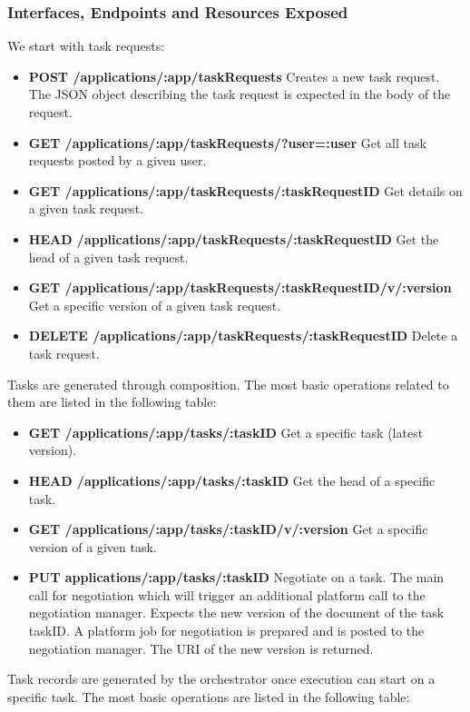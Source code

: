 \subsubsection{Interfaces, Endpoints and Resources Exposed}
We start with task requests:
\begin{itemize}
\item {\bf POST /applications/:app/taskRequests} Creates a new task request. The JSON object describing the task request is expected in the body of the request. %
\item {\bf GET /applications/:app/taskRequests/?user=:user} Get all task requests posted by a given user.
\item {\bf GET /applications/:app/taskRequests/:taskRequestID} Get details on a given task request.
\item {\bf HEAD /applications/:app/taskRequests/:taskRequestID} Get the head of a given task request.
\item {\bf GET /applications/:app/taskRequests/:taskRequestID/v/:version} Get a specific version of a given task request.
\item {\bf DELETE /applications/:app/taskRequests/:taskRequestID} Delete a task request.
\end{itemize}
Tasks are generated through composition. The most basic operations related to them are listed in the following table:
\begin{itemize}
\item {\bf GET /applications/:app/tasks/:taskID} Get a specific task (latest version).
\item {\bf HEAD /applications/:app/tasks/:taskID} Get the head of a specific task.
\item {\bf GET /applications/:app/tasks/:taskID/v/:version} Get a specific version of a given task.
\item {\bf PUT applications/:app/tasks/:taskID} Negotiate on a task. The main call for negotiation which will trigger an additional platform call to the negotiation manager. Expects the new version of the document of the task taskID. A platform job for negotiation is prepared and is posted to the negotiation manager. The URI of the new version is returned.
\end{itemize}
Task records are generated by the orchestrator once execution can start on a specific task. The most basic operations are listed in the following table:
